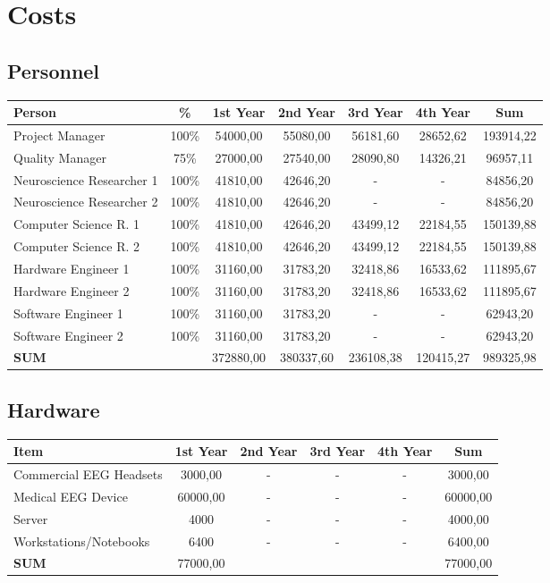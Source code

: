 \section{Costs}
\label{sect:costs}
\subsection{Personnel}
\begin{tabular}{|l|c|c|c|c|c|c|}
\hline 
Person & \% & 1st Year & 2nd Year & 3rd Year & 4th Year & Sum \\ 
\hline 
Project Manager & 100\% & 54000,00 & 55080,00 & 56181,60 & 28652,62 & 193914,22 \\ 
\hline 
Quality Manager & 75\% & 27000,00 & 27540,00 & 28090,80 & 14326,21 & 96957,11 \\ 
\hline 
Neuroscience Researcher 1 & 100\% & 41810,00 & 42646,20 & - & - & 84856,20 \\ 
\hline 
Neuroscience Researcher 2 & 100\% & 41810,00 & 42646,20 & - & - & 84856,20 \\ 
\hline 
Computer Science R. 1 & 100\% & 41810,00 & 42646,20 & 43499,12 & 22184,55 & 150139,88 \\ 
\hline 
Computer Science R. 2 & 100\% & 41810,00 & 42646,20 & 43499,12 & 22184,55 & 150139,88 \\ 
\hline 
Hardware Engineer 1 & 100\% & 31160,00 & 31783,20 & 32418,86 & 16533,62 & 111895,67 \\ 
\hline 
Hardware Engineer 2 & 100\% & 31160,00 & 31783,20 & 32418,86 & 16533,62 & 111895,67 \\ 
\hline 
Software Engineer 1 & 100\% & 31160,00 & 31783,20 & - & - & 62943,20 \\ 
\hline 
Software Engineer 2 & 100\% & 31160,00 & 31783,20 & - & - & 62943,20 \\ 
\hline 
\textbf{SUM} & & 372880,00 & 380337,60 & 236108,38 & 120415,27 & 989325,98 \\ 
\hline 
\end{tabular} 

\subsection{Hardware}
\begin{tabular}{|l|c|c|c|c|c|}
\hline 
Item & 1st Year & 2nd Year & 3rd Year & 4th Year & Sum \\ 
\hline 
Commercial EEG Headsets & 3000,00 & - & - & - & 3000,00 \\ 
\hline 
Medical EEG Device & 60000,00 & - & - & - & 60000,00 \\ 
\hline 
Server & 4000 & - & - & - & 4000,00 \\ 
\hline 
Workstations/Notebooks & 6400 & - & - & - & 6400,00 \\ 
\hline 
\textbf{SUM} & 77000,00 &  &  &  & 77000,00 \\ 
\hline 
\end{tabular}

